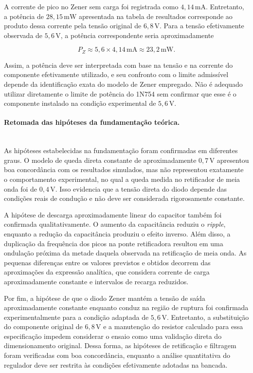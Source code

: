 \documentclass[11pt,a4paper]{article}
\begin{document}
A corrente de pico no Zener sem carga foi registrada como $4{,}14\,\text{mA}$. Entretanto, a potência de $28{,}15\,\text{mW}$ apresentada na tabela de resultados corresponde ao produto dessa corrente pela tensão original de $6{,}8\,\text{V}$. Para a tensão efetivamente observada de $5{,}6\,\text{V}$, a potência correspondente seria aproximadamente

\[
P_Z \approx 5{,}6 \times 4{,}14\,\text{mA}
\approx 23{,}2\,\text{mW}.
\]

Assim, a potência deve ser interpretada com base na tensão e na corrente do componente efetivamente utilizado, e seu confronto com o limite admissível depende da identificação exata do modelo de Zener empregado. Não é adequado utilizar diretamente o limite de potência do 1N754 sem confirmar que esse é o componente instalado na condição experimental de $5{,}6\,\text{V}$.

\paragraph{Retomada das hipóteses da fundamentação teórica.}\mbox{}\\

As hipóteses estabelecidas na fundamentação foram confirmadas em diferentes graus. O modelo de queda direta constante de aproximadamente $0{,}7\,\text{V}$ apresentou boa concordância com os resultados simulados, mas não representou exatamente o comportamento experimental, no qual a queda medida no retificador de meia onda foi de $0{,}4\,\text{V}$. Isso evidencia que a tensão direta do diodo depende das condições reais de condução e não deve ser considerada rigorosamente constante.

A hipótese de descarga aproximadamente linear do capacitor também foi confirmada qualitativamente. O aumento da capacitância reduziu o \textit{ripple}, enquanto a redução da capacitância produziu o efeito inverso. Além disso, a duplicação da frequência dos picos na ponte retificadora resultou em uma ondulação próxima da metade daquela observada na retificação de meia onda. As pequenas diferenças entre os valores previstos e obtidos decorrem das aproximações da expressão analítica, que considera corrente de carga aproximadamente constante e intervalos de recarga reduzidos.

Por fim, a hipótese de que o diodo Zener mantém a tensão de saída aproximadamente constante enquanto conduz na região de ruptura foi confirmada experimentalmente para a condição adaptada de $5{,}6\,\text{V}$. Entretanto, a substituição do componente original de $6{,}8\,\text{V}$ e a manutenção do resistor calculado para essa especificação impedem considerar o ensaio como uma validação direta do dimensionamento original. Dessa forma, as hipóteses de retificação e filtragem foram verificadas com boa concordância, enquanto a análise quantitativa do regulador deve ser restrita às condições efetivamente adotadas na bancada.
\end{document}
